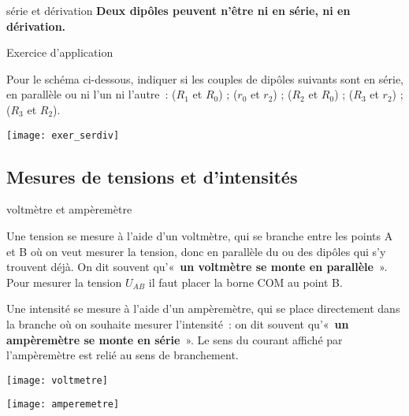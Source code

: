 \documentclass[../main/main.tex]{subfiles}
\begin{document}
    
\begin{rema}[label=rema:serdiv, halign=center]{série et dérivation}
    \textbf{Deux dipôles peuvent n'être ni en série, ni en dérivation.}
\end{rema}
\begin{NCcexe}[label=exer:serdiv]{Exercice d'application}

    \begin{minipage}{0.65\linewidth}
        
        Pour le schéma ci-dessous, indiquer si les couples de dipôles suivants
        sont en série, en parallèle ou ni l'un ni l'autre~: ($R_1$ et $R_0$) ;
        ($r_0$ et $r_2$) ; ($R_2$ et $R_0$) ; ($R_3$ et $r_2$) ; ($R_3$ et
        $R_2$).

    \end{minipage}
    \begin{minipage}{0.35\linewidth}
        \begin{center}
            \texttt{[image: exer\_serdiv]}
        \end{center}
    \end{minipage}
    \tcblower
    \vspace*{2cm}
\end{NCcexe}

\subsection{Mesures de tensions et d'intensités}

\begin{prop}[label=prop:mesure, sidebyside]{voltmètre et ampèremètre}

   Une tension se mesure à l'aide d'un voltmètre, qui se branche entre les
   points A et B où on veut mesurer la tension, donc en parallèle du ou des
   dipôles qui s'y trouvent déjà. On dit souvent qu'«~\textbf{un voltmètre se
   monte en parallèle}~». Pour mesurer la tension $U_{AB}$ il faut placer la
   borne COM au point B. 

   \bigbreak

    Une intensité se mesure à l'aide d'un ampèremètre, qui se place directement
    dans la branche où on souhaite mesurer l'intensité~: on dit souvent
    qu'«~\textbf{un ampèremètre se monte en série}~». Le sens du courant affiché
    par l'ampèremètre est relié au sens de branchement.

    \tcblower
    \begin{center}
        \texttt{[image: voltmetre]}
    \end{center}
    \begin{center}
        \texttt{[image: amperemetre]}
    \end{center}
\end{prop}
\end{document}
